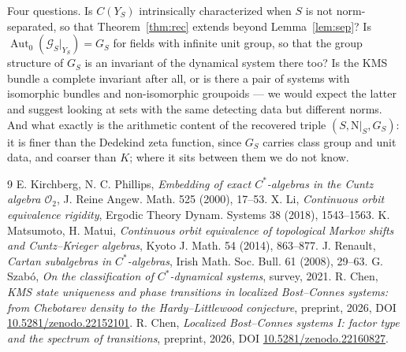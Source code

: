 \documentclass[11pt]{amsart}
\numberwithin{equation}{section}
\theoremstyle{definition}
\theoremstyle{remark}
\newcommand{\cG}{\mathcal{G}}
\newcommand{\Ns}{\mathrm{N}}
\begin{document}
Four questions. Is $C(Y_S)$ intrinsically characterized when $S$ is not norm-separated, so
that Theorem~\ref{thm:rec} extends beyond Lemma~\ref{lem:sep}? Is
$\operatorname{Aut}_0(\cG_S|_{Y_S})=G_S$ for fields with infinite unit group, so that the group
structure of $G_S$ is an invariant of the dynamical system there too? Is the KMS bundle a
complete invariant after
all, or is there a pair of systems with isomorphic bundles and non-isomorphic groupoids ---
we would expect the latter and suggest looking at sets with the same detecting data but
different norms. And what exactly is the arithmetic content of the recovered triple
$(S,\Ns|_S,G_S)$: it is finer than the Dedekind zeta function, since $G_S$ carries class group
and unit data, and coarser than $K$; where it sits between them we do not know.

\begin{thebibliography}{9}
 E. Kirchberg, N. C. Phillips, \emph{Embedding of exact $C^*$-algebras in the Cuntz algebra $\mathcal O_2$}, J. Reine Angew. Math. 525 (2000), 17--53.
 X. Li, \emph{Continuous orbit equivalence rigidity}, Ergodic Theory Dynam. Systems 38 (2018), 1543--1563.
 K. Matsumoto, H. Matui, \emph{Continuous orbit equivalence of topological Markov shifts and Cuntz--Krieger algebras}, Kyoto J. Math. 54 (2014), 863--877.
 J. Renault, \emph{Cartan subalgebras in $C^*$-algebras}, Irish Math. Soc. Bull. 61 (2008), 29--63.
 G. Szab\'o, \emph{On the classification of $C^*$-dynamical systems}, survey, 2021.
 R. Chen, \emph{KMS state uniqueness and phase transitions in localized Bost--Connes systems: from Chebotarev density to the Hardy--Littlewood conjecture}, preprint, 2026, DOI \href{https://doi.org/10.5281/zenodo.22152101}{10.5281/zenodo.22152101}.
 R. Chen, \emph{Localized Bost--Connes systems I: factor type and the spectrum of transitions}, preprint, 2026, DOI \href{https://doi.org/10.5281/zenodo.22160827}{10.5281/zenodo.22160827}.
\end{thebibliography}
\end{document}
